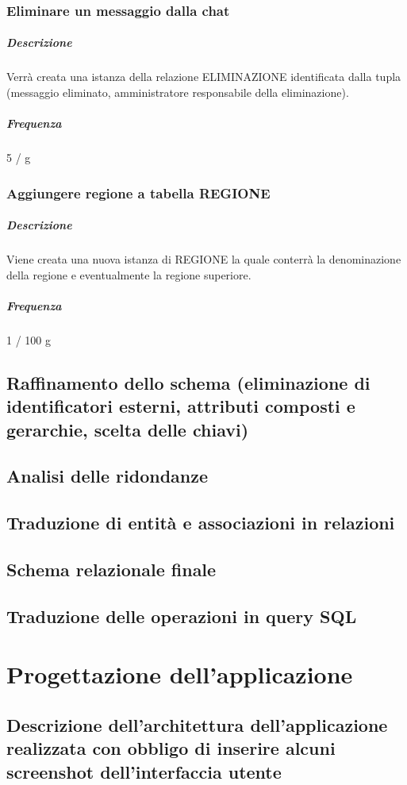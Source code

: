 \documentclass[a4paper,12pt]{report}
\begin{document}
\subsection{Eliminare un messaggio dalla chat}
\paragraph{Descrizione} Verrà creata una istanza della relazione ELIMINAZIONE identificata dalla tupla (messaggio eliminato, amministratore responsabile della eliminazione).
\paragraph{Frequenza} 5 / g

\subsection{Aggiungere regione a tabella REGIONE}
\paragraph{Descrizione} Viene creata una nuova istanza di REGIONE la quale conterrà la denominazione della regione e eventualmente la regione superiore.
\paragraph{Frequenza} 1 / 100 g

\section{Raffinamento dello schema (eliminazione di identificatori esterni, attributi composti e gerarchie, scelta delle chiavi)}
\section{Analisi delle ridondanze}
\section{Traduzione di entità e associazioni in relazioni}
\section{Schema relazionale finale}
\section{Traduzione delle operazioni in query SQL}
\chapter{Progettazione dell'applicazione}
\section{Descrizione dell'architettura dell'applicazione realizzata con obbligo di inserire alcuni screenshot dell'interfaccia utente}
\end{document}
